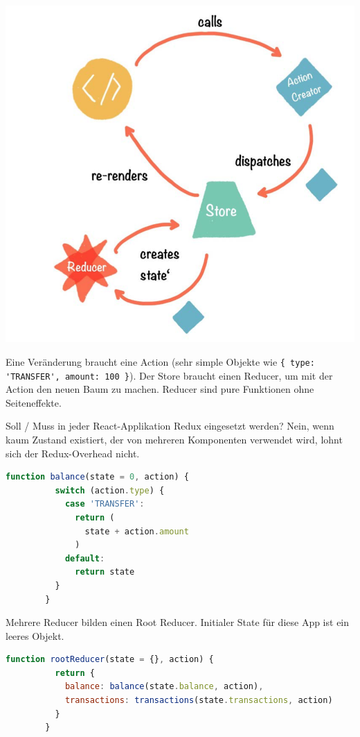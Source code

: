 \documentclass[10pt,landscape]{article}
\begin{document}
\begin{multicols}{2}
        \includegraphics[width=\linewidth]{redux_data_flow}

        Eine Veränderung braucht eine Action (sehr simple Objekte wie \lstinline!{ type: 'TRANSFER', amount: 100 }!).
        Der Store braucht einen Reducer, um mit der Action den neuen Baum zu machen.
        Reducer sind pure Funktionen ohne Seiteneffekte.

        Soll / Muss in jeder React-Applikation Redux eingesetzt werden?
        Nein, wenn kaum Zustand existiert, der von mehreren Komponenten verwendet wird, lohnt sich der Redux-Overhead nicht.

        \begin{lstlisting}[language=JavaScript]
        function balance(state = 0, action) {
          switch (action.type) {
            case 'TRANSFER':
              return (
                state + action.amount
              )
            default:
              return state
          }
        }
        \end{lstlisting}

        Mehrere Reducer bilden einen Root Reducer.
        Initialer State für diese App ist ein leeres Objekt.

        \begin{lstlisting}[language=JavaScript]
        function rootReducer(state = {}, action) {
          return {
            balance: balance(state.balance, action),
            transactions: transactions(state.transactions, action)
          }
        }


\end{lstlisting}
\end{multicols}
\end{document}
